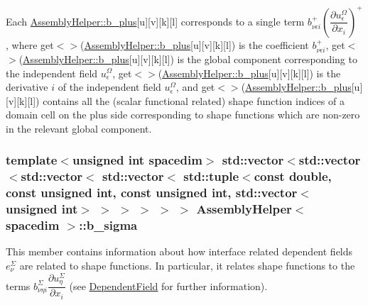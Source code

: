 Each \hyperlink{class_assembly_helper_ab09dd07d3ec596525be83f8f5859bef7}{Assembly\+Helper\+::b\+\_\+plus}\mbox{[}{\ttfamily u}\mbox{]}\mbox{[}{\ttfamily v}\mbox{]}\mbox{[}{\ttfamily k}\mbox{]}\mbox{[}{\ttfamily l}\mbox{]} corresponds to a single term $b^+_{\nu\epsilon i} \left(\dfrac{\partial u^\Omega_\epsilon}{\partial x_i}\right)^+$, where {\ttfamily get$<${$>$}(\hyperlink{class_assembly_helper_ab09dd07d3ec596525be83f8f5859bef7}{Assembly\+Helper\+::b\+\_\+plus}}\mbox{[}{\ttfamily u}\mbox{]}\mbox{[}{\ttfamily v}\mbox{]}\mbox{[}{\ttfamily k}\mbox{]}\mbox{[}{\ttfamily l}\mbox{]}) is the coefficient $b^+_{\nu\epsilon i}$, {\ttfamily get$<${$>$}(\hyperlink{class_assembly_helper_ab09dd07d3ec596525be83f8f5859bef7}{Assembly\+Helper\+::b\+\_\+plus}}\mbox{[}{\ttfamily u}\mbox{]}\mbox{[}{\ttfamily v}\mbox{]}\mbox{[}{\ttfamily k}\mbox{]}\mbox{[}{\ttfamily l}\mbox{]}) is the global component corresponding to the independent field $u^\Omega_\epsilon$, {\ttfamily get$<${$>$}(\hyperlink{class_assembly_helper_ab09dd07d3ec596525be83f8f5859bef7}{Assembly\+Helper\+::b\+\_\+plus}}\mbox{[}{\ttfamily u}\mbox{]}\mbox{[}{\ttfamily v}\mbox{]}\mbox{[}{\ttfamily k}\mbox{]}\mbox{[}{\ttfamily l}\mbox{]}) is the derivative $i$ of the independent field $u^\Omega_\epsilon$, and {\ttfamily get$<${$>$}(\hyperlink{class_assembly_helper_ab09dd07d3ec596525be83f8f5859bef7}{Assembly\+Helper\+::b\+\_\+plus}}\mbox{[}{\ttfamily u}\mbox{]}\mbox{[}{\ttfamily v}\mbox{]}\mbox{[}{\ttfamily k}\mbox{]}\mbox{[}{\ttfamily l}\mbox{]}) contains all the (scalar functional related) shape function indices of a domain cell on the plus side corresponding to shape functions which are non-\/zero in the relevant global component. 
\subsubsection[{\texorpdfstring{b\+\_\+sigma}{b_sigma}}]{\setlength{\rightskip}{0pt plus 5cm}template$<$unsigned int spacedim$>$ std\+::vector$<$std\+::vector$<$std\+::vector$<$ std\+::vector$<$ std\+::tuple$<$const double, const unsigned int, const unsigned int, std\+::vector$<$unsigned int$>$ $>$ $>$ $>$ $>$ $>$ {\bf Assembly\+Helper}$<$ spacedim $>$\+::b\+\_\+sigma\hspace{0.3cm}{\ttfamily [private]}}\hypertarget{class_assembly_helper_af58c9a1c7093edc306070913aa1b9be2}{}\label{class_assembly_helper_af58c9a1c7093edc306070913aa1b9be2}
This member contains information about how interface related dependent fields $e^\Sigma_\nu$ are related to shape functions. In particular, it relates shape functions to the terms $b^\Sigma_{\nu \eta i} \dfrac{\partial u^\Sigma_\eta}{\partial x_i}$ (see \hyperlink{class_dependent_field}{Dependent\+Field} for further information).

